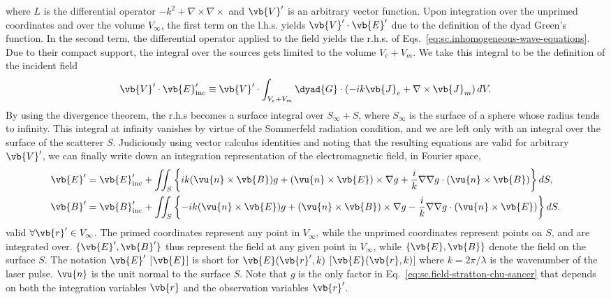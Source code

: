 \documentclass[11pt,SymmetricalJury]{inrsthesis/inrsthesis}
\begin{document}
where $L$ is the differential operator $-k^2+\nabla\times\nabla\times$ and
$\vb{V}'$ is an arbitrary vector function. Upon integration over the unprimed
coordinates and over the volume $V_\infty$, the first term on the l.h.s. yields
$\vb{V}'\cdot\vb{E}'$ due to the definition of the dyad Green's function. In the
second term, the differential operator applied to the field yields the r.h.s. of
Eqs.~\ref{eq:sc.inhomogeneous-wave-equations}. Due to their compact support, the
integral over the sources gets limited to the volume $V_e+V_m$. We take this
integral to be the definition of the incident field
  \begin{equation}
    \vb{V}'\cdot\vb{E}_\text{inc}' \equiv \vb{V}'\cdot\int_{V_e+V_m}\dyad{G}\cdot\left(-ik\vb{J}_e+\nabla\times\vb{J}_m\right)dV.
  \end{equation}
By using the divergence theorem, the r.h.s becomes a surface integral over
$S_\infty+S$, where $S_\infty$ is the surface of a sphere whose radius tends to
infinity. This integral at infinity vanishes by virtue of the Sommerfeld
radiation condition, and we are left only with an integral over the surface of
the scatterer $S$. Judiciously using vector calculus identities \cite{Tai1997}
and noting that the resulting equations are valid for arbitrary $\vb{V}'$, we
can finally write down an integration representation of the electromagnetic
field, in Fourier space,
  \begin{subequations}
  \label{eq:sc.field-stratton-chu-sancer}
  \begin{align}
  \vb{E}' &=
     \vb{E}_\text{inc}'+\iint_{S}
    \left\{ ik(\vu{n}\times \vb{B})              g
          +   (\vu{n}\times \vb{E})\times \nabla g
          +\frac{i}{k}\nabla\nabla g\cdot(\vu{n}\times\vb{B})
    \right\} dS,
  \label{eq:sc.efield-stratton-chu-sancer}\\
  \vb{B}' &=
    \vb{B}_\text{inc}' + \iint_{S}
    \left\{-ik(\vu{n}\times \vb{E})              g
          +   (\vu{n}\times \vb{B})\times \nabla g
          -\frac{i}{k}\nabla\nabla g\cdot(\vu{n}\times\vb{E})
    \right\} dS.
  \label{eq:sc.bfield-stratton-chu-sancer}
  \end{align}
  \end{subequations}
valid $\forall\vb{r}'\in V_\infty$. The primed coordinates
represent any point in $V_\infty$, while the unprimed coordinates represent points
on $S$, and are integrated over. $\{\vb{E}', \vb{B}'\}$ thus represent the field at any
given point in $V_\infty$, while $\{\vb{E}, \vb{B}\}$ denote the field on the surface $S$.
The notation $\vb{E}'$ [$\vb{E}$] is short for $\vb{E}(\vb{r}',k)$ [$\vb{E}(\vb{r},k)$]
where $k=2\pi/\lambda$ is the wavenumber of the laser pulse. $\vu{n}$ is the unit normal
to the surface $S$. Note that $g$ is the
only factor in Eq.~\eqref{eq:sc.field-stratton-chu-sancer}
that depends on both the integration variables $\vb{r}$
and the observation variables $\vb{r}'$.
\end{document}
